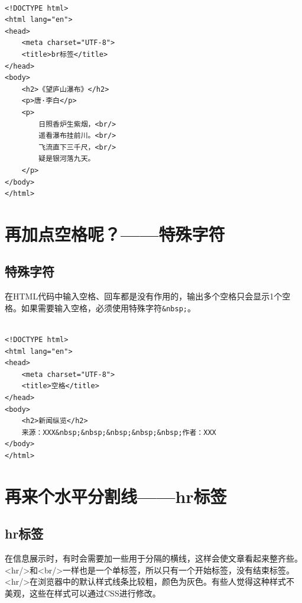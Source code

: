  \\

\begin{lstlisting}[style=htmlcssjs]
<!DOCTYPE html>
<html lang="en">
<head>
    <meta charset="UTF-8">
    <title>br标签</title>
</head>
<body>
    <h2>《望庐山瀑布》</h2>
    <p>唐·李白</p>
    <p>
        日照香炉生紫烟，<br/>
        遥看瀑布挂前川。<br/>
        飞流直下三千尺，<br/>
        疑是银河落九天。
    </p>
</body>
</html>
\end{lstlisting}

\newpage

\section{再加点空格呢？——特殊字符}

\subsection{特殊字符}

在HTML代码中输入空格、回车都是没有作用的，输出多个空格只会显示1个空格。如果需要输入空格，必须使用特殊字符\lstinline|&nbsp;|。 \\

 \\

\begin{lstlisting}[style=htmlcssjs]
<!DOCTYPE html>
<html lang="en">
<head>
    <meta charset="UTF-8">
    <title>空格</title>
</head>
<body>
    <h2>新闻纵览</h2>
    来源：XXX&nbsp;&nbsp;&nbsp;&nbsp;&nbsp;作者：XXX
</body>
</html>
\end{lstlisting}

\newpage

\section{再来个水平分割线——hr标签}

\subsection{hr标签}

在信息展示时，有时会需要加一些用于分隔的横线，这样会使文章看起来整齐些。 \\

<hr/>和<br/>一样也是一个单标签，所以只有一个开始标签，没有结束标签。 \\

<hr/>在浏览器中的默认样式线条比较粗，颜色为灰色。有些人觉得这种样式不美观，这些在样式可以通过CSS进行修改。 \\

